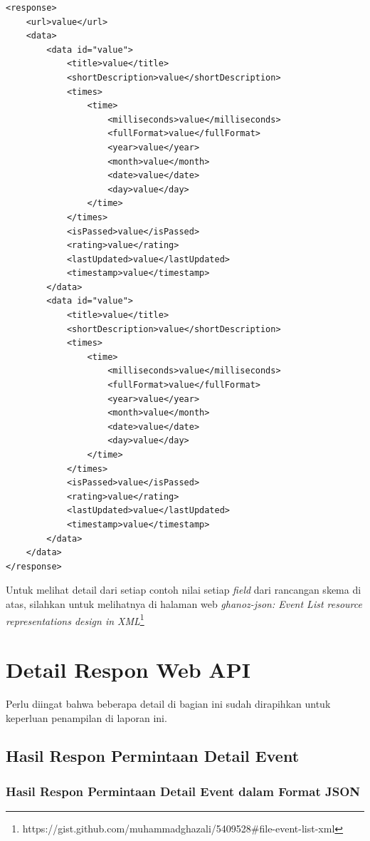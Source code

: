 \documentclass[a4paper, 12pt, oneside]{report}
\begin{document}
\begin{lstlisting}[frame=single]
<response>
    <url>value</url>
    <data>
        <data id="value">
            <title>value</title>
            <shortDescription>value</shortDescription>
            <times>
                <time>
                    <milliseconds>value</milliseconds>
                    <fullFormat>value</fullFormat>
                    <year>value</year>
                    <month>value</month>
                    <date>value</date>
                    <day>value</day>
                </time>
            </times>
            <isPassed>value</isPassed>
            <rating>value</rating>
            <lastUpdated>value</lastUpdated>
            <timestamp>value</timestamp>
        </data>
        <data id="value">
            <title>value</title>
            <shortDescription>value</shortDescription>
            <times>
                <time>
                    <milliseconds>value</milliseconds>
                    <fullFormat>value</fullFormat>
                    <year>value</year>
                    <month>value</month>
                    <date>value</date>
                    <day>value</day>
                </time>
            </times>
            <isPassed>value</isPassed>
            <rating>value</rating>
            <lastUpdated>value</lastUpdated>
            <timestamp>value</timestamp>
        </data>
    </data>
</response>
\end{lstlisting}

\onehalfspacing Untuk melihat detail dari setiap contoh nilai setiap \textit{field} dari rancangan skema di atas, silahkan untuk melihatnya di halaman web \textit{ghanoz-json: Event List resource representations design in XML}\footnote{https://gist.github.com/muhammadghazali/5409528\#file-event-list-xml}

\chapter{Detail Respon Web API} \label{lampiran:detail-respon-web-api}

\onehalfspacing Perlu diingat bahwa beberapa detail di bagian ini sudah dirapihkan untuk keperluan penampilan di laporan ini.

\section{Hasil Respon Permintaan Detail Event}

\subsection{Hasil Respon Permintaan Detail Event dalam Format JSON}
\end{document}
